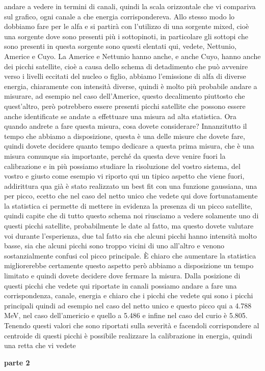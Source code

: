 andare a vedere in termini di canali, quindi la scala orizzontale che vi compariva sul grafico, ogni canale a che energia corrispondereva. Allo stesso modo lo dobbiamo fare per le alfa e si partirà con l'utilizzo di una sorgente mixed, cioè una sorgente dove sono presenti più i sottopinoti, in particolare gli sottopi che sono presenti in questa sorgente sono questi elentati qui, vedete, Nettunio, Americe e Cuyo. La Americe e Nettunio hanno anche, e anche Cuyo, hanno anche dei picchi satellite, cioè a causa dello schema di detadimento che può avvenire verso i livelli eccitati del nucleo o figlio, abbiamo l'emissione di alfa di diverse energia, chiaramente con intensità diverse, quindi è molto più probabile andare a misurare, ad esempio nel caso dell'Americe, questo decalimento piuttosto che quest'altro, però potrebbero essere presenti picchi satellite che possono essere anche identificate se andate a effettuare una misura ad alta statistica. Ora quando andrete a fare questa misura, cosa dovete considerare? Innanzitutto il tempo che abbiamo a disposizione, questa è una delle misure che dovete fare, quindi dovete decidere quanto tempo dedicare a questa prima misura, che è una misura comunque sia importante, perché da questa deve venire fuori la calibrazione e in più possiamo studiare la risoluzione del vostro sistema, del vostro e giusto come esempio vi riporto qui un tipico aspetto che viene fuori, addirittura qua già è stato realizzato un best fit con una funzione gaussiana, una per picco, ecetto che nel caso del netto unico che vedete qui dove fortunatamente la statistica ci permette di mettere in evidenza la presenza di un picco satellite, quindi capite che di tutto questo schema noi riusciamo a vedere solamente uno di questi picchi satellite, probabilmente le date al fatto, ma questo dovete valutare voi durante l'esperienza, due tal fatto sia che alcuni picchi hanno intensità molto basse, sia che alcuni picchi sono troppo vicini di uno all'altro e venono sostanzialmente confusi col picco principale. È chiaro che aumentare la statistica migliorerebbe certamente questo aspetto però abbiamo a disposizione un tempo limitato e quindi dovete decidere dove fermare la misura. Dalla posizione di questi picchi che vedete qui riportate in canali possiamo andare a fare una corrispondenza, canale, energia e chiaro che i picchi che vedete qui sono i picchi principali quindi ad esempio nel caso del netto unico e questo picco qui a 4.788 MeV, nel caso dell'americio e quello a 5.486 e infine nel caso del curio è 5.805. Tenendo questi valori che sono riportati sulla severità e facendoli corrispondere al centroide di questi picchi è possibile realizzare la calibrazione in energia, quindi una retta che vi vedete 

\textbf{parte 2}